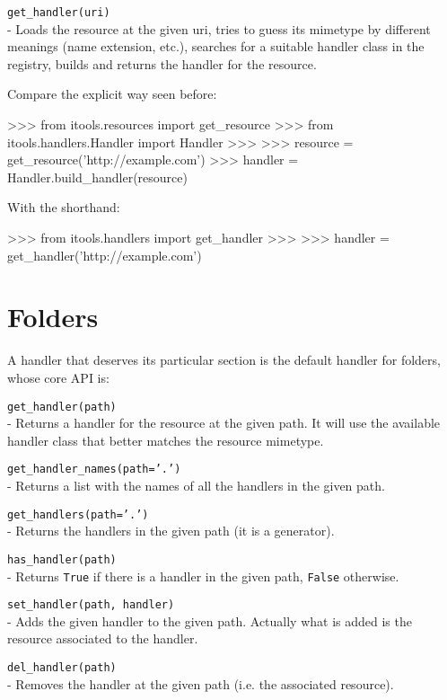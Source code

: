 \begin{api}
  {\tt get\_handler(uri)}\\
  - Loads the resource at the given uri, tries to guess its mimetype by
  different meanings (name extension, etc.), searches for a suitable
  handler class in the registry, builds and returns the handler for
  the resource.
\end{api}

Compare the explicit way seen before:

\begin{code}
    >>> from itools.resources import get_resource
    >>> from itools.handlers.Handler import Handler
    >>>
    >>> resource = get_resource('http://example.com')
    >>> handler = Handler.build_handler(resource)
\end{code}

With the shorthand:

\begin{code}
    >>> from itools.handlers import get_handler
    >>>
    >>> handler = get_handler('http://example.com')
\end{code}


\section{Folders}

A handler that deserves its particular section is the default handler for
folders, whose core API is:

\begin{api}
  {\tt get\_handler(path)}\\
  - Returns a handler for the resource at the given path. It will use the
    available handler class that better matches the resource mimetype.

  {\tt get\_handler\_names(path='.')}\\
  - Returns a list with the names of all the handlers in the given path.

  {\tt get\_handlers(path='.')}\\
  - Returns the handlers in the given path (it is a generator).

  {\tt has\_handler(path)}\\
  - Returns {\tt True} if there is a handler in the given path, {\tt False}
    otherwise.

  {\tt set\_handler(path, handler)}\\
  - Adds the given handler to the given path. Actually what is added is
    the resource associated to the handler.

  {\tt del\_handler(path)}\\
  - Removes the handler at the given path (i.e. the associated resource).
\end{api}

